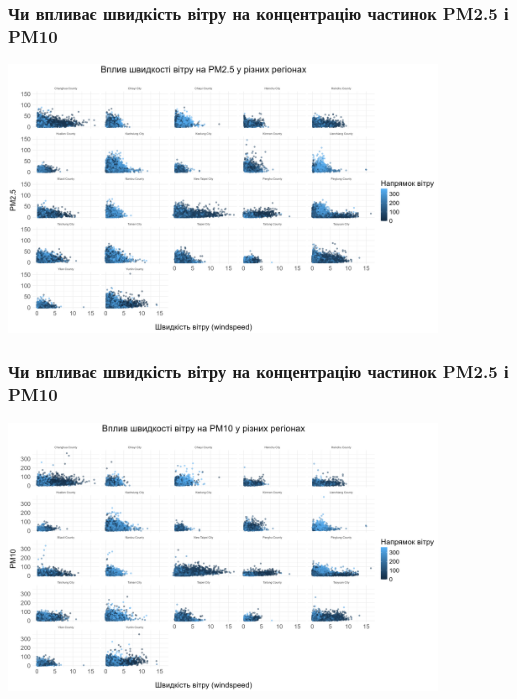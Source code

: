 \documentclass{beamer}
\begin{document}
\begin{frame}
  \frametitle{Чи впливає швидкість вітру на концентрацію частинок PM2.5 і PM10}

  \begin{center}
    \includegraphics[height=2.8in]{plots/question1/scatter_pm2_5_region.png}
  \end{center}
\end{frame}

\begin{frame}
  \frametitle{Чи впливає швидкість вітру на концентрацію частинок PM2.5 і PM10}

  \begin{center}
    \includegraphics[height=2.8in]{plots/question1/scatter_pm10_region.png}
  \end{center}
\end{frame}
\end{document}
